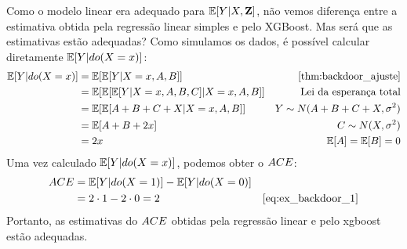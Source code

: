\begin{example}
\begin{knitrout}
\end{knitrout}

 Como o modelo linear era adequado para ${\mathbb E}[Y|X,{\mathbf{Z}}]$,
 não vemos diferença entre a estimativa obtida
 pela regressão linear simples e pelo XGBoost.
 Mas será que as estimativas estão adequadas?
 Como simulamos os dados,
 é possível calcular diretamente ${\mathbb E}[Y|do(X=x)]$:
 \begin{align}
  \label{eq:ex_backdoor_1}
  \E[Y|do(X=x)]
  &= \E[\E[Y|X=x, A, B]]
  & \text{\cref{thm:backdoor_ajuste}} \nonumber \\
  &= \E[\E[\E[Y|X=x, A, B, C]|X=x, A, B]]
  & \text{Lei da esperança total} \nonumber \\
  &= \E[\E[A+B+C+X|X=x, A, B]]
  & Y \sim N(A+B+C+X, \sigma^2) \nonumber \\
  &= \E[A + B + 2x]
  & C \sim N(X, \sigma^2) \nonumber \\
  &= 2x
  & \E[A] = \E[B] = 0
 \end{align}
 Uma vez calculado ${\mathbb E}[Y|do(X=x)]$,
 podemos obter o ${ACE}$:
 \begin{align*}
  \ACE
  &= \E[Y|do(X=1)] - \E[Y|do(X=0)] \\
  &= 2 \cdot 1 - 2 \cdot 0 = 2
  & \text{\cref{eq:ex_backdoor_1}}
 \end{align*}
 Portanto, as estimativas do ${ACE}$ obtidas 
 pela regressão linear e pelo xgboost 
 estão adequadas.
\end{example}

